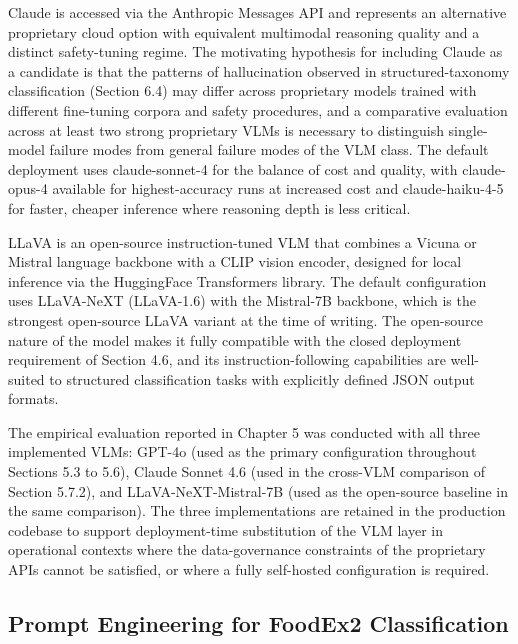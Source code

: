 Claude is accessed via the Anthropic Messages API and represents an alternative proprietary cloud option with equivalent multimodal reasoning quality and a distinct safety-tuning regime. The motivating hypothesis for including Claude as a candidate is that the patterns of hallucination observed in structured-taxonomy classification (Section 6.4) may differ across proprietary models trained with different fine-tuning corpora and safety procedures, and a comparative evaluation across at least two strong proprietary VLMs is necessary to distinguish single-model failure modes from general failure modes of the VLM class. The default deployment uses claude-sonnet-4 for the balance of cost and quality, with claude-opus-4 available for highest-accuracy runs at increased cost and claude-haiku-4-5 for faster, cheaper inference where reasoning depth is less critical.

LLaVA is an open-source instruction-tuned VLM that combines a Vicuna or Mistral language backbone with a CLIP vision encoder, designed for local inference via the HuggingFace Transformers library. The default configuration uses LLaVA-NeXT (LLaVA-1.6) with the Mistral-7B backbone, which is the strongest open-source LLaVA variant at the time of writing. The open-source nature of the model makes it fully compatible with the closed deployment requirement of Section 4.6, and its instruction-following capabilities are well-suited to structured classification tasks with explicitly defined JSON output formats.

The empirical evaluation reported in Chapter 5 was conducted with all three implemented VLMs: GPT-4o (used as the primary configuration throughout Sections 5.3 to 5.6), Claude Sonnet 4.6 (used in the cross-VLM comparison of Section 5.7.2), and LLaVA-NeXT-Mistral-7B (used as the open-source baseline in the same comparison). The three implementations are retained in the production codebase to support deployment-time substitution of the VLM layer in operational contexts where the data-governance constraints of the proprietary APIs cannot be satisfied, or where a fully self-hosted configuration is required.

\hypertarget{prompt-engineering-for-foodex2-classification}{%
\subsection{Prompt Engineering for FoodEx2 Classification}\label{prompt-engineering-for-foodex2-classification}}

